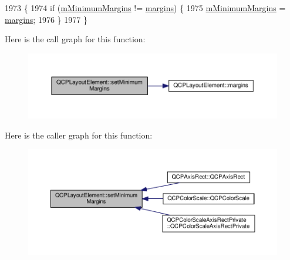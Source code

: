 \begin{DoxyCode}
1973                                                                 \{
1974   \textcolor{keywordflow}{if} (\hyperlink{class_q_c_p_layout_element_a5ba71f25d1af4bb092b28df618538e63}{mMinimumMargins} != \hyperlink{class_q_c_p_layout_element_a85ff977dfcced84eef32d9f819ec9543}{margins}) \{
1975     \hyperlink{class_q_c_p_layout_element_a5ba71f25d1af4bb092b28df618538e63}{mMinimumMargins} = \hyperlink{class_q_c_p_layout_element_a85ff977dfcced84eef32d9f819ec9543}{margins};
1976   \}
1977 \}
\end{DoxyCode}


Here is the call graph for this function\+:\nopagebreak
\begin{figure}[H]
\begin{center}
\leavevmode
\includegraphics[width=350pt]{class_q_c_p_layout_element_a0a8a17abc16b7923159fcc7608f94673_cgraph}
\end{center}
\end{figure}




Here is the caller graph for this function\+:\nopagebreak
\begin{figure}[H]
\begin{center}
\leavevmode
\includegraphics[width=350pt]{class_q_c_p_layout_element_a0a8a17abc16b7923159fcc7608f94673_icgraph}
\end{center}
\end{figure}


\hypertarget{class_q_c_p_layout_element_a5dd29a3c8bc88440c97c06b67be7886b}{}
